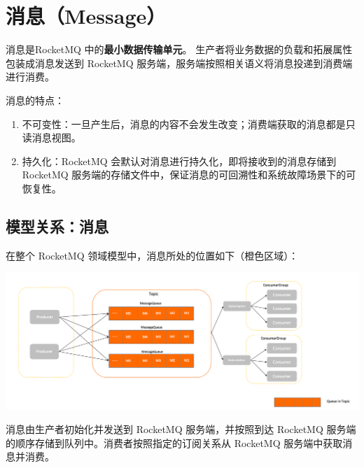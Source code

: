 \documentclass[11pt, a4paper, oneside, fontset=none]{ctexbook}
\begin{document}
\section{消息（Message）}
消息是RocketMQ 中的{\bfseries\kaishu 最小数据传输单元}。
生产者将业务数据的负载和拓展属性包装成消息发送到 RocketMQ 服务端，服务端按照相关语义将消息投递到消费端进行消费。

消息的特点：
\begin{enumerate}
  \item 不可变性：一旦产生后，消息的内容不会发生改变；消费端获取的消息都是只读消息视图。
  \item 持久化：RocketMQ 会默认对消息进行持久化，即将接收到的消息存储到 RocketMQ 服务端的存储文件中，保证消息的可回溯性和系统故障场景下的可恢复性。
\end{enumerate}

\subsection{模型关系：消息}
在整个 RocketMQ 领域模型中，消息所处的位置如下（橙色区域）：

\begin{center}
  \begin{minipage}{\textwidth}
    \center
    \includegraphics[width=\textwidth]{picture/模型关系：消息.png}
    \captionsetup{hypcap=false}
    \label{fig:模型关系：消息}
  \end{minipage}
\end{center}

消息由生产者初始化并发送到 RocketMQ 服务端，并按照到达 RocketMQ 服务端的顺序存储到队列中。消费者按照指定的订阅关系从 RocketMQ 服务端中获取消息并消费。
\end{document}
